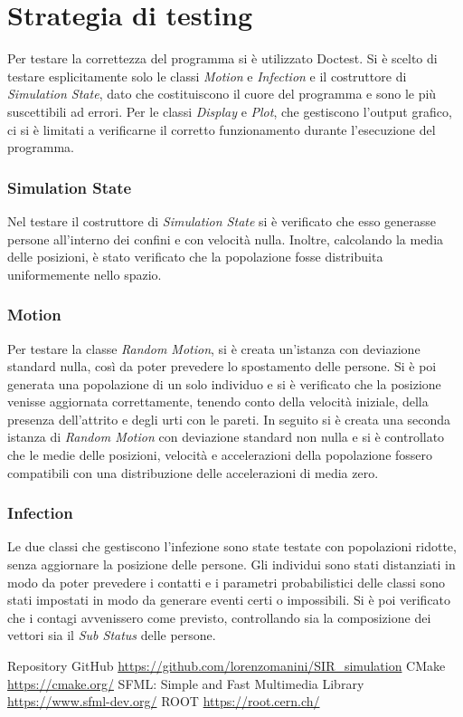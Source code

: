 \documentclass[a4paper,10pt,twocolumn]{article}
\begin{document}
\section{Strategia di testing}
Per testare la correttezza del programma si è utilizzato Doctest. Si è scelto di testare esplicitamente solo le classi \emph{Motion} e \emph{Infection} e il costruttore di \emph{Simulation State}, dato che costituiscono il cuore del programma e sono le più suscettibili ad errori. Per le classi \emph{Display} e \emph{Plot}, che gestiscono l'output grafico, ci si è limitati a verificarne il corretto funzionamento durante l'esecuzione del programma.

\subsubsection*{Simulation State}
Nel testare il costruttore di \emph{Simulation State} si è verificato che esso generasse persone all'interno dei confini e con velocità nulla. Inoltre, calcolando la media delle posizioni, è stato verificato che la popolazione fosse distribuita uniformemente nello spazio.

\subsubsection*{Motion}
Per testare la classe \emph{Random Motion}, si è creata un'istanza con deviazione standard nulla, così da poter prevedere lo spostamento delle persone. Si è poi generata una popolazione di un solo individuo e si è verificato che la posizione venisse aggiornata correttamente, tenendo conto della velocità iniziale, della presenza dell'attrito e degli urti con le pareti. In seguito si è creata una seconda istanza di \emph{Random Motion} con deviazione standard non nulla e si è controllato che le medie delle posizioni, velocità e accelerazioni della popolazione fossero compatibili con una distribuzione delle accelerazioni di media zero.

\subsubsection*{Infection}
Le due classi che gestiscono l'infezione sono state testate con popolazioni ridotte, senza aggiornare la posizione delle persone. Gli individui sono stati distanziati in modo da poter prevedere i contatti e i parametri probabilistici delle classi sono stati impostati in modo da generare eventi certi o impossibili. Si è poi verificato che i contagi avvenissero come previsto, controllando sia la composizione dei vettori sia il \emph{Sub Status} delle persone.

\begin{thebibliography}{9}
     Repository GitHub \url{https://github.com/lorenzomanini/SIR\_simulation}
     CMake \url{https://cmake.org/}
     SFML: Simple and Fast Multimedia Library \url{https://www.sfml-dev.org/}
     ROOT \url{https://root.cern.ch/}
\end{thebibliography}
\end{document}
